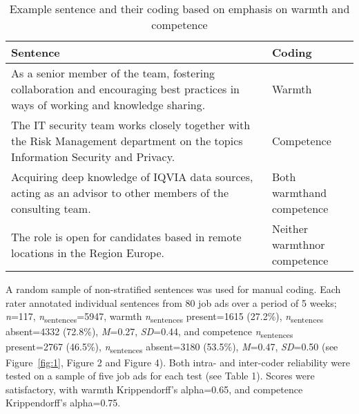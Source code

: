\documentclass[man]{apa7}
\begin{document}
\begin{table}[!h]
    \centering
    \caption{Example sentence and their coding based on emphasis on warmth and competence}
    \begin{spacing}{1.2}\centering
    \begin{tabular}{@{}p{0.75\linewidth} p{0.25\linewidth}}
    \toprule
        Sentence & Coding \\
        \midrule
        As a senior member of the team, fostering collaboration and encouraging best practices in ways of working and knowledge sharing. & Warmth \\
        The IT security team works closely together with the Risk Management department on the topics Information Security and Privacy. & Competence \\
        Acquiring deep knowledge of IQVIA data sources, acting as an advisor to other members of the consulting team. & Both warmth\newline and competence \\
        The role is open for candidates based in remote locations in the Region Europe. & Neither warmth\newline nor competence \\
        \bottomrule
    \end{tabular}
    \end{spacing}
    \label{table:1}
\end{table}

A random sample of non-stratified sentences was used for manual coding. Each rater annotated individual sentences from 80 job ads over a period of 5 weeks; \textit{n}=117, \textit{n}\textsubscript{sentences}=5947, warmth \textit{n}\textsubscript{sentences} present=1615 (27.2\%), \textit{n}\textsubscript{sentences} absent=4332 (72.8\%), \textit{M}=0.27, \textit{SD}=0.44, and competence \textit{n}\textsubscript{sentences} present=2767 (46.5\%), \textit{n}\textsubscript{sentences} absent=3180 (53.5\%), \textit{M}=0.47, \textit{SD}=0.50 (see Figure~\ref{fig:1}, Figure 2 and Figure 4). Both intra- and inter-coder reliability were tested on a sample of five job ads for each test (see Table 1). Scores were satisfactory, with warmth Krippendorff’s alpha=0.65, and competence Krippendorff’s alpha=0.75.
\end{document}
